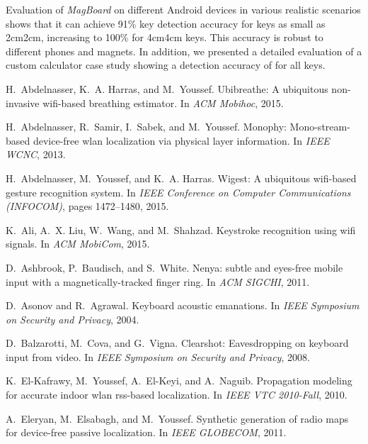 \documentclass[conference]{IEEEtran}
\def \sys {\textit{MagBoard}}
\begin{document}
Evaluation of \sys{} on different Android devices in various realistic scenarios shows that it can achieve 91\% key detection accuracy for keys as small as 2cm2cm, increasing to 100\% for  4cm4cm keys.  This accuracy is robust to different phones and magnets. In addition, we presented a detailed evaluation of a custom calculator case study showing a detection accuracy of  for all keys.


\begin{thebibliography}{10}

H.~Abdelnasser, K.~A. Harras, and M.~Youssef.
\newblock Ubibreathe: A ubiquitous non-invasive wifi-based breathing estimator.
\newblock In {\em ACM Mobihoc}, 2015.

H.~Abdelnasser, R.~Samir, I.~Sabek, and M.~Youssef.
\newblock Monophy: Mono-stream-based device-free wlan localization via physical
  layer information.
\newblock In {\em IEEE WCNC}, 2013.

H.~Abdelnasser, M.~Youssef, and K.~A. Harras.
\newblock Wigest: A ubiquitous wifi-based gesture recognition system.
\newblock In {\em IEEE Conference on Computer Communications (INFOCOM)}, pages
  1472--1480, 2015.

K.~Ali, A.~X. Liu, W.~Wang, and M.~Shahzad.
\newblock Keystroke recognition using wifi signals.
\newblock In {\em ACM MobiCom}, 2015.

D.~Ashbrook, P.~Baudisch, and S.~White.
\newblock Nenya: subtle and eyes-free mobile input with a magnetically-tracked
  finger ring.
\newblock In {\em ACM SIGCHI}, 2011.

D.~Asonov and R.~Agrawal.
\newblock Keyboard acoustic emanations.
\newblock In {\em IEEE Symposium on Security and Privacy}, 2004.

D.~Balzarotti, M.~Cova, and G.~Vigna.
\newblock Clearshot: Eavesdropping on keyboard input from video.
\newblock In {\em IEEE Symposium on Security and Privacy}, 2008.

K.~El-Kafrawy, M.~Youssef, A.~El-Keyi, and A.~Naguib.
\newblock Propagation modeling for accurate indoor wlan rss-based localization.
\newblock In {\em IEEE VTC 2010-Fall}, 2010.

A.~Eleryan, M.~Elsabagh, and M.~Youssef.
\newblock Synthetic generation of radio maps for device-free passive
  localization.
\newblock In {\em IEEE GLOBECOM}, 2011.


\end{thebibliography}
\end{document}
